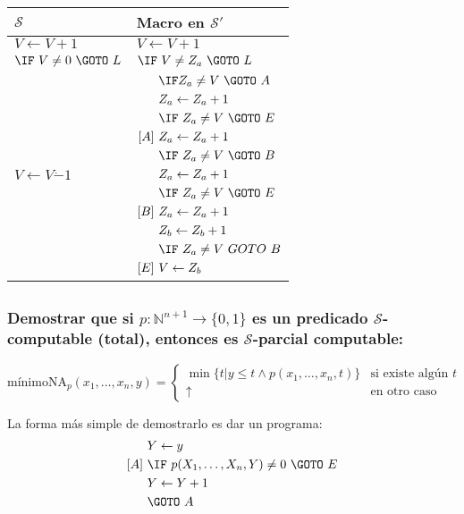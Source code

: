 \documentclass[fleqn, 11pt]{article}
\newcommand{\nat}{\mathbb{N}}
\newcommand{\Scur}{\mathcal{S}}
\newcommand{\indef}{\uparrow}
\newcommand{\into}{\leftarrow}
\begin{document}
\begin{tabular}{l l}
	$\Scur$                     & Macro en $\Scur'$ \\ \toprule
	$V \into V + 1$             & $V \into V + 1$ \\
	$\IF\ V \neq 0\ \GOTO\ L$ & $\IF\ V \neq Z_a\ \GOTO\ L$ \\
	$V \into V \dot- 1$         &
	$\begin{aligned}
		     &\IF Z_a \neq V\ \GOTO\ A \\
		     &Z_a \into Z_a + 1 \\
		     &\IF\ Z_a \neq V\ \GOTO\ E \\
		[A]\ &Z_a \into Z_a + 1 \\
		     &\IF\ Z_a \neq V\ \GOTO\ B \\
		     &Z_a \into Z_a + 1 \\
		     &\IF\ Z_a \neq V\ \GOTO\ E \\
		[B]\ &Z_a \into Z_a + 1 \\
		     &Z_b \into Z_b + 1 \\
		     &\IF\ Z_a \neq V\ GOTO\ B \\
		[E]\ &V \into Z_b
	\end{aligned}$
\end{tabular}

\subsection{}

\subsubsection{Demostrar que si $p : \nat^{n+1} \to \{0, 1\}$ es un predicado
$\Scur$-computable (total), entonces es $\Scur$-parcial computable:}
\[
	\text{mínimoNA}_p(x_1, \dots, x_n, y) =
	\begin{cases}
		\min \{t | y \leq t \land p(x_1, \dots, x_n, t)\}
			& \text{si existe algún } t \\
		\indef & \text{en otro caso}
	\end{cases}
\]

La forma más simple de demostrarlo es dar un programa:
\begin{align*}
	     &Y \into y \\
	[A]\ &\IF\ p(X_1, \dots, X_n, Y) \neq 0\ \GOTO\ E \\
	     &Y \into Y + 1 \\
	     &\GOTO\ A
\end{align*}
\end{document}
